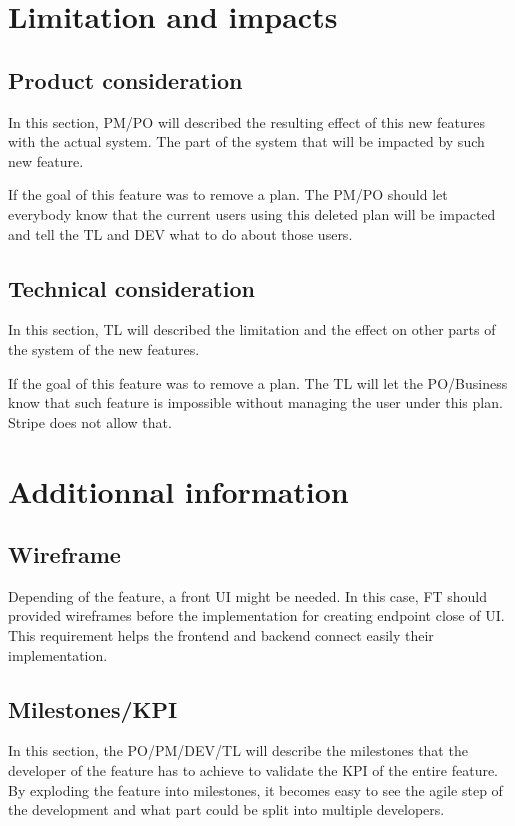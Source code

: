 \documentclass[a4paper,article,oneside]{memoir}
\begin{document}
     \chapter{Limitation and impacts}
        \section{Product consideration}
        In this section, \gls{PM}/\gls{PO} will described the resulting effect of this new features with the actual system. The part of the system that will be impacted by such new feature.

\noindent{}

        If the goal of this feature was to remove a plan. The \gls{PM}/\gls{PO} should let everybody know that the current users using this deleted plan will be impacted and tell the \gls{TL} and \gls{DEV} what to do about those users. 
        \section{Technical consideration}
        In this section, \gls{TL} will described the limitation and the effect on other parts of the system of the new features.    

\noindent{}

        If the goal of this feature was to remove a plan. The \gls{TL} will let the \gls{PO}/\gls{Business} know that such feature is impossible without managing the user under this plan. Stripe does not allow that.
      \chapter{Additionnal information}
      	\section{Wireframe}
      		Depending of the feature, a front UI might be needed. In this case, \gls{FT} should provided wireframes before the implementation for creating endpoint close of UI. This requirement helps the frontend and backend connect easily their implementation.
      	\section{Milestones/KPI}
      	In this section, the \gls{PO}/\gls{PM}/\gls{DEV}/\gls{TL} will describe the milestones that the developer of the feature has to achieve to validate the KPI of the entire feature. By exploding the feature into milestones, it becomes easy to see the agile step of the development and what part could be split into multiple developers.
      	
\end{document}
